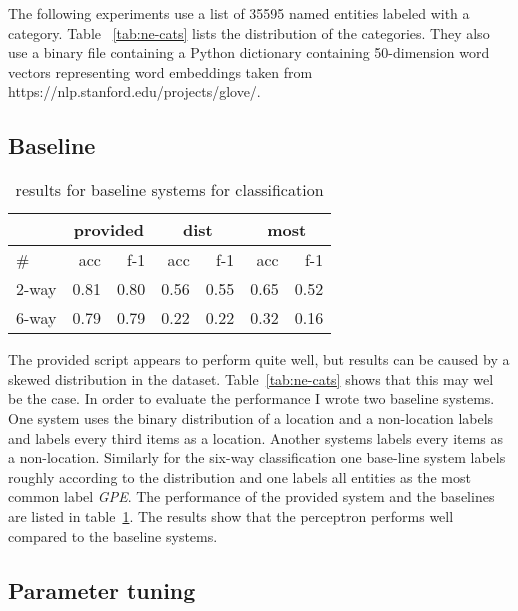 \documentclass[11pt]{article}
\begin{document}
The following experiments use a list of 35595 named entities labeled with a category. Table ~\ref{tab:ne-cats} lists the distribution of the categories. They also use a binary file containing a Python dictionary containing 50-dimension word vectors representing word embeddings taken from https://nlp.stanford.edu/projects/glove/.

\subsection{Baseline}

\begin{table}[ht]\footnotesize
  \caption{results for baseline systems for classification}
  \label{tab:baseline}
  \begin{tabular}{ l | r r | r r | r r }
    & \multicolumn{2}{c}{provided} & \multicolumn{2}{c}{dist} & \multicolumn{2}{c}{most} \\
    \hline
    \# & acc & f-1 & acc & f-1 & acc & f-1 \\
    2-way & 0.81 & 0.80 & 0.56 & 0.55 & 0.65 & 0.52 \\
    6-way & 0.79 & 0.79 & 0.22 & 0.22 & 0.32 & 0.16 \\
  \end{tabular}
\end{table}

The provided script appears to perform quite well, but results can be caused by a skewed distribution in the dataset. Table~\ref{tab:ne-cats} shows that this may wel be the case. In order to evaluate the performance I wrote two baseline systems. One system uses the binary distribution of a location and  a non-location labels and labels every third items as a location. Another systems labels every items as a non-location. Similarly for the six-way classification one base-line system labels roughly according to the distribution and one labels all entities as the most common label \emph{GPE}. The performance of the provided system and the baselines are listed in table~\ref{tab:baseline}. The results show that the perceptron performs well compared to the baseline systems.

\subsection{Parameter tuning}
\end{document}
